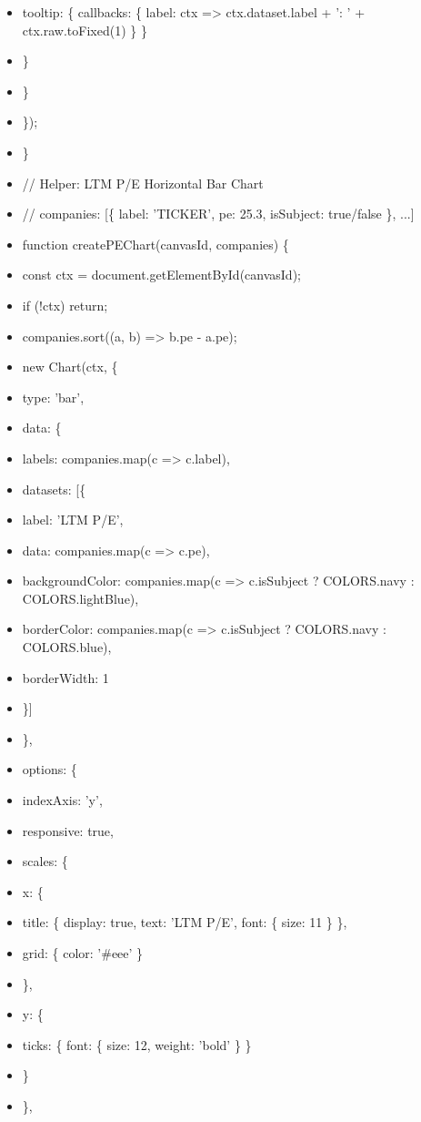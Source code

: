 \documentclass[11pt]{article}
\begin{document}
\begin{itemize}[leftmargin=*,itemsep=2pt,topsep=2pt]
\item {} tooltip: \{ callbacks: \{ label: ctx => ctx.dataset.label + ': ' + ctx.raw.toFixed(1) \} \}
\item {} \}
\item {} \}
\item {} \});
\item {} \}
\item {} // Helper: LTM P/E Horizontal Bar Chart
\item {} // companies: [\{ label: 'TICKER', pe: 25.3, isSubject: true/false \}, ...]
\item {} function createPEChart(canvasId, companies) \{
\item {} const ctx = document.getElementById(canvasId);
\item {} if (!ctx) return;
\item {} companies.sort((a, b) => b.pe - a.pe);
\item {} new Chart(ctx, \{
\item {} type: 'bar',
\item {} data: \{
\item {} labels: companies.map(c => c.label),
\item {} datasets: [\{
\item {} label: 'LTM P/E',
\item {} data: companies.map(c => c.pe),
\item {} backgroundColor: companies.map(c => c.isSubject ? COLORS.navy : COLORS.lightBlue),
\item {} borderColor: companies.map(c => c.isSubject ? COLORS.navy : COLORS.blue),
\item {} borderWidth: 1
\item {} \}]
\item {} \},
\item {} options: \{
\item {} indexAxis: 'y',
\item {} responsive: true,
\item {} scales: \{
\item {} x: \{
\item {} title: \{ display: true, text: 'LTM P/E', font: \{ size: 11 \} \},
\item {} grid: \{ color: '\#eee' \}
\item {} \},
\item {} y: \{
\item {} ticks: \{ font: \{ size: 12, weight: 'bold' \} \}
\item {} \}
\item {} \},

\end{itemize}
\end{document}
